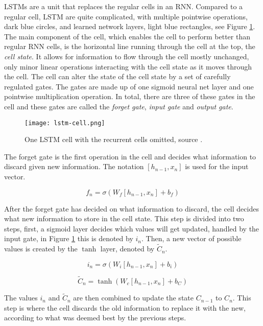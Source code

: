 \documentclass[../main.tex]{subfiles}
\begin{document}
LSTMs are a unit that replaces the regular cells in an RNN. Compared to a regular cell, LSTM are quite complicated, with multiple pointwise operations, dark blue circles, and learned network layers, light blue rectangles, see Figure \ref{fig:lstm-cell}. The main component of the cell, which enables the cell to perform better than regular RNN cells, is the horizontal line running through the cell at the top, the \textit{cell state}. It allows for information to flow through the cell mostly unchanged, only minor linear operations interacting with the cell state as it moves through the cell. The cell can alter the state of the cell state by a set of carefully regulated gates. The gates are made up of one sigmoid neural net layer and one pointwise multiplication operation. In total, there are three of these gates in the cell and these gates are called the \textit{forget gate}, \textit{input gate} and \textit{output gate}.

\begin{figure}[H]
\centering
\texttt{[image: lstm-cell.png]}
\caption{One LSTM cell with the recurrent cells omitted, source \cite{colah_2015}.}
\label{fig:lstm-cell}
\end{figure}



The forget gate is the first operation in the cell and decides what information to discard given new information. The notation $\left[h_{n-1},x_n \right]$ is used for the input vector.

$$f_n = \sigma \left( W_f \left[h_{n-1},x_n\right] + b_f\right)$$

After the forget gate has decided on what information to discard, the cell decides what new information to store in the cell state. This step is divided into two steps, first, a sigmoid layer decides which values will get updated, handled by the input gate, in Figure \ref{fig:lstm-cell} this is denoted by $i_n$. Then, a new vector of possible values is created by the $\tanh$ layer, denoted by $\tilde{C}_n$.

$$i_n = \sigma \left( W_i\left[ h_{n-1}, x_n \right] + b_i \right)$$

$$\tilde{C}_n = \tanh \left( W_c \left[ h_{n-1}, x_n \right] + b_C\right)$$

The values $i_n$ and $\tilde{C}_n$ are then combined to update the state $C_{n-1}$ to $C_n$. This step is where the cell discards the old information to replace it with the new, according to what was deemed best by the previous steps.
\end{document}

